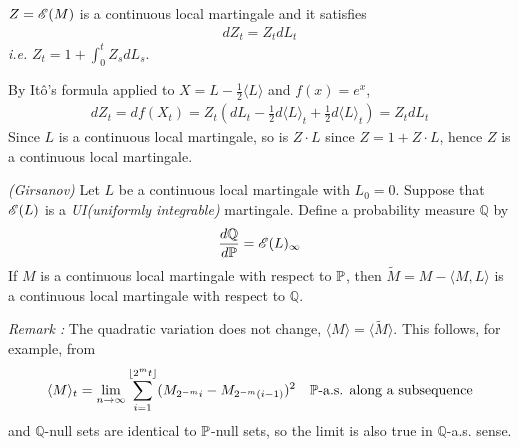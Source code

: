 \documentclass[10pt,a4paper]{article}
\newenvironment{proof}
{\begin{changemargin}{0.5cm}{0.5cm} 
	}%
	{\end{changemargin}
}
\newenvironment{p}
{\begin{proof} 
	}%
	{\end{proof}
}
\begin{document}
\fact $Z = \mathscr{E} (M)$ is a continuous local martingale and it satisfies
\begin{align*}
dZ_t = Z_t dL_t
\end{align*}
\emph{i.e.} $Z_t = 1 + \int_0^t Z_s dL_s$.
\begin{p}
\pf By It\^o's formula applied to $X = L - \frac{1}{2} \langle L \rangle$ and $f(x) = e^x$,
\begin{align*}
dZ_t = df(X_t) = Z_t (dL_t - \frac{1}{2} d\langle L \rangle_t + \frac{1}{2} d\langle L \rangle_t) = Z_t dL_t
\end{align*}
Since $L$ is a continuous local martingale, so is $Z\cdot L$ since $Z= 1+Z\cdot L$, hence $Z$ is a continuous local martingale.

\eop 
\end{p}
\s

\thm \emph{(Girsanov)} Let $L$ be a continuous local martingale with $L_0 =0$. Suppose that $\mathscr{E} (L)$ is a \emph{UI(uniformly integrable)} martingale. Define a probability measure $\mathbb{Q}$ by
\begin{align*}
\frac{d\mathbb{Q}}{d \mathbb{P}} = \mathscr{E} (L)_{\infty}
\end{align*}
If $M$ is a continuous local martingale with respect to $\mathbb{P}$, then $\tilde{M} = M - \langle M, L\rangle$ is a continuous local martingale with respect to $\mathbb{Q}$.
\s

\emph{Remark :} The quadratic variation does not change, $\langle M \rangle = \langle \tilde{M} \rangle$. This follows, for example, from
\begin{align*}
\langle M \rangle_t = \lim_{n\rightarrow \infty} \sum_{i=1}^{\lfloor 2^m t \rfloor} (M_{2^{-m}i} - M_{2^{-m}(i-1)})^2 \quad \mathbb{P}\text{-a.s. along a subsequence}
\end{align*}
and $\mathbb{Q}$-null sets are identical to $\mathbb{P}$-null sets, so the limit is also true in $\mathbb{Q}$-a.s. sense. 
\s
\end{document}
